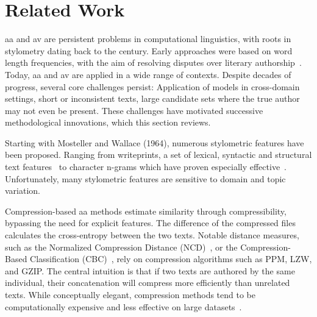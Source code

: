 \label{chap:related_work}
\chapter{Related Work}



\ac{aa} and \ac{av} are persistent problems in computational linguistics, with roots in stylometry dating back to the  century. 
Early approaches were based on word length frequencies, with the aim of resolving disputes over literary authorship~\citep{neal_surveying_2018,stamatatos_survey_2009}.
Today, \ac{aa} and \ac{av} are applied in a wide range of contexts. 
Despite decades of progress, several core challenges persist: 
Application of models in cross-domain settings, short or inconsistent texts, large candidate sets where the true author may not even be present. 
These challenges have motivated successive methodological innovations, which this section reviews.

Starting with Mosteller and Wallace (1964), numerous stylometric features have been proposed. 
Ranging from writeprints, a set of lexical, syntactic and structural text features~\citep{abbasi_writeprints_2008} to character n-grams which have proven especially effective~\citep{tyo_state_2022,altakrori_topic_2021,koppel_authorship_2011}. 
Unfortunately, many stylometric features are sensitive to domain and topic variation.

Compression-based \ac{aa} methods estimate similarity through compressibility, bypassing the need for explicit features. 
The difference of the compressed files calculates the cross-entropy between the two texts.
Notable distance measures, such as the Normalized Compression Distance (NCD)~\citep{elmanarelbouanani_authorship_2014}, or the Compression-Based Classification (CBC)~\citep{bevendorff_divergence_based_2020,bevendorff_overview_2024}, rely on compression algorithms such as PPM, LZW, and GZIP. 
The central intuition is that if two texts are authored by the same individual, their concatenation will compress more efficiently than unrelated texts. 
While conceptually elegant, compression methods tend to be computationally expensive and less effective on large datasets~\citep{tyo_state_2022}. 

